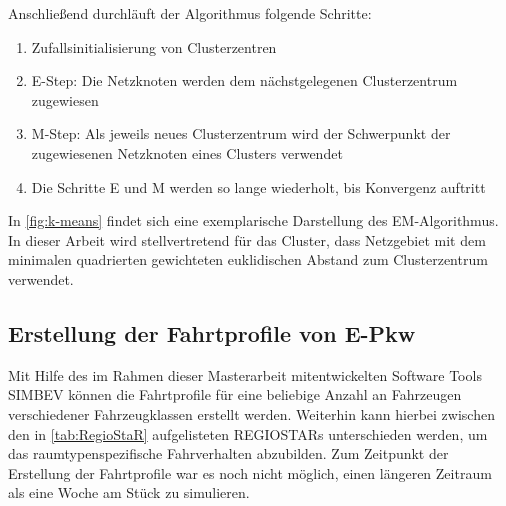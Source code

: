\noindent Anschließend durchläuft der Algorithmus folgende Schritte:

\begin{enumerate}
	\item Zufallsinitialisierung von Clusterzentren
	\item E-Step: Die Netzknoten werden dem nächstgelegenen Clusterzentrum zugewiesen
	\item M-Step: Als jeweils neues Clusterzentrum wird der Schwerpunkt der zugewiesenen Netzknoten eines Clusters verwendet
	\item Die Schritte E und M werden so lange wiederholt, bis Konvergenz auftritt
\end{enumerate}


In \autoref{fig:k-means} findet sich eine exemplarische Darstellung des EM-Algorithmus.
In dieser Arbeit wird stellvertretend für das Cluster, dass Netzgebiet mit dem minimalen quadrierten gewichteten euklidischen Abstand zum Clusterzentrum verwendet. \cite{Mueller2019}




\subsection{Erstellung der Fahrtprofile von E-Pkw}\label{chap:simbev_theo}


Mit Hilfe des im Rahmen dieser Masterarbeit mitentwickelten Software Tools \gls{SIMBEV} können die Fahrtprofile für eine beliebige Anzahl an Fahrzeugen verschiedener Fahrzeugklassen erstellt werden.
Weiterhin kann hierbei zwischen den in \autoref{tab:RegioStaR} aufgelisteten \glspl{REGIOSTAR} unterschieden werden, um das raumtypenspezifische Fahrverhalten abzubilden.
Zum Zeitpunkt der Erstellung der Fahrtprofile war es noch nicht möglich, einen längeren Zeitraum als eine Woche am Stück zu simulieren.



